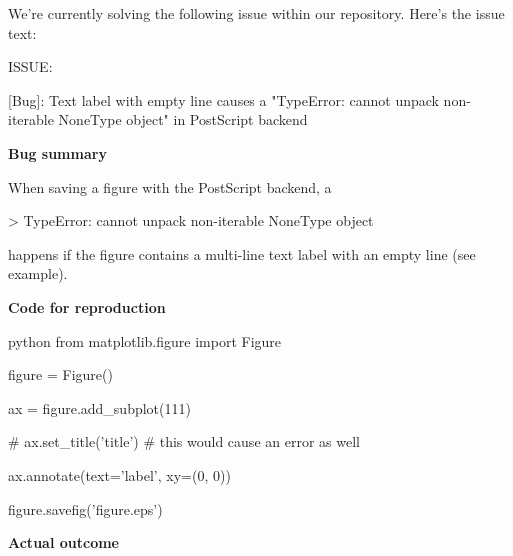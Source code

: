 {
\captionsetup{type=figure}
\begin{issuebox}We're currently solving the following issue within our repository. Here's the issue text:

ISSUE:

[Bug]: Text label with empty line causes a "TypeError: cannot unpack non-iterable NoneType object" in PostScript backend

{\large \textbf{Bug summary}}



When saving a figure with the PostScript backend, a

> TypeError: cannot unpack non-iterable NoneType object



happens if the figure contains a multi-line text label with an empty line (see example).

{\large \textbf{Code for reproduction}}

\begin{CodeVerbatim}[breaklines=true, breakanywhere=true]
python
from matplotlib.figure import Figure



figure = Figure()

ax = figure.add\_subplot(111)

# ax.set\_title('\nLower title')  # this would cause an error as well


ax.annotate(text='\nLower label', xy=(0, 0))

figure.savefig('figure.eps')
\end{CodeVerbatim}


{\large \textbf{Actual outcome}}



\end{issuebox}}
